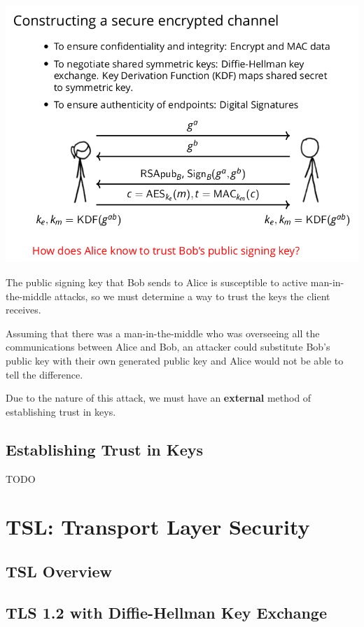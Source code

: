 \documentclass[11pt]{article} %
\begin{document}
{\includegraphics[scale=.7]{./tls4.png}

The public signing key that Bob sends to Alice is susceptible to
active man-in-the-middle attacks, so we must determine a way to trust the keys 
the client receives.

\bigskip
Assuming that there was a man-in-the-middle who was overseeing all the
communications between Alice and Bob, an attacker could substitute Bob's public
key with their own generated public key and Alice would not be able to tell 
the difference.

\bigskip
Due to the nature of this attack, we must have an \textbf{external} method of
establishing trust in keys.

\newpage
\subsection{Establishing Trust in Keys}
TODO

\newpage
\section{TSL: Transport Layer Security}

\subsection{TSL Overview}

\newpage
\subsection{TLS 1.2 with Diffie-Hellman Key Exchange}

}
\end{document}
